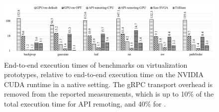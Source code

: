 
% 



\begin{figure}[!ht!!]
	\centering
	\includegraphics[width=.9\linewidth,clip]{trillium/data/cross_product_overhead_noRPC_OptInit.pdf}
	\caption{{\footnotesize End-to-end execution times of benchmarks on virtualization prototypes, relative to end-to-end execution time on the NVIDIA CUDA runtime in a native setting.
			The gRPC transport overhead is removed from the reported measurements, which is up to 10\% of the total execution time for API remoting, and 40\% for \trillium.}}
	\label{fig_all_overhead} \end{figure}

